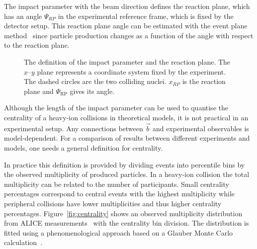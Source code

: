 The impact parameter with the beam direction defines the reaction plane, which has an angle $\Psi_{RP}$ in the experimental reference frame, which is fixed by the detector setup. This reaction plane angle can be estimated with the event plane method~\cite{Voloshin:2008dg} since particle production changes as a function of the angle with respect to the reaction plane. 
\begin{figure}[h!]
\centering
%      

\caption[The definitions of the Reaction Plane coordinate systems]{The definition of the impact parameter and the reaction plane. The $x$--$y$ plane represents a coordinate system fixed by the experiment. The dashed circles are the two colliding nuclei. $x_{RP}$ is the reaction plane and $\Psi_\mathrm{RP}$ gives its angle.} %
\label{fig:planes}
\end{figure}

Although the length of the impact parameter can be used to quantise the centrality of a heavy-ion collisions in theoretical models, it is not practical in an experimental setup. Any connections between $\vec b$ and experimental observables is model-dependent. For a comparison of results between different experiments and models, one needs a general definition for centrality.

In practice this definition is provided by dividing events into percentile bins by the observed multiplicity of produced particles. In a heavy-ion collision the total multiplicity can be related to the number of participants. Small centrality percentages correspond to central events with the highest multiplicity while peripheral collisions have lower multiplicities and thus higher centrality percentages. Figure~\ref{fig:centrality} shows an observed multiplicity distribution from ALICE measurements~\cite{PhysRevC.88.044909} with the centrality bin division. The distribution is fitted using a phenomenological approach based on a Glauber Monte Carlo calculation~\cite{Miller:2007ri}.

